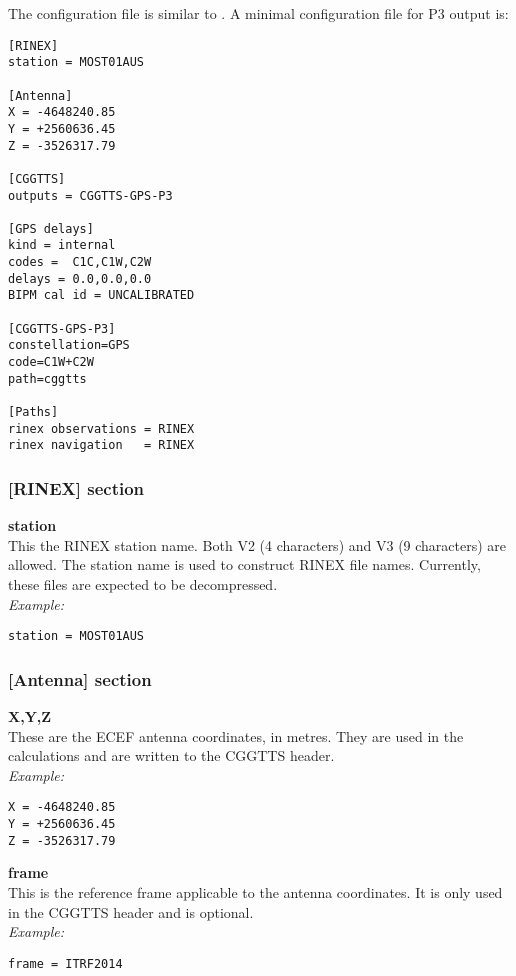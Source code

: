 The configuration file is similar to .
A minimal configuration file for P3 output is:

\begin{lstlisting}
[RINEX]
station = MOST01AUS

[Antenna]
X = -4648240.85 
Y = +2560636.45 
Z = -3526317.79 

[CGGTTS]
outputs = CGGTTS-GPS-P3

[GPS delays]
kind = internal
codes =  C1C,C1W,C2W
delays = 0.0,0.0,0.0
BIPM cal id = UNCALIBRATED

[CGGTTS-GPS-P3]
constellation=GPS
code=C1W+C2W
path=cggtts

[Paths]
rinex observations = RINEX
rinex navigation   = RINEX

\end{lstlisting}

\subsubsection{[RINEX] section }

{\bfseries station}\\
This the RINEX station name. 
Both V2 (4 characters) and V3 (9 characters) are allowed.
The station name is used to construct RINEX file names.
Currently, these files are expected to be decompressed.\\
\textit{Example:}
\begin{lstlisting}
station = MOST01AUS
\end{lstlisting}

\subsubsection{[Antenna] section }

{\bfseries X,Y,Z}\\
These are the ECEF antenna coordinates, in metres.
They are used in the calculations and are written to the CGGTTS header.\\
\textit{Example:}
\begin{lstlisting}
X = -4648240.85 
Y = +2560636.45 
Z = -3526317.79
\end{lstlisting}


{\bfseries frame}\\
This is the reference frame applicable to the antenna coordinates.
It is only used in the CGGTTS header and is optional.\\
\textit{Example:}
\begin{lstlisting}
frame = ITRF2014
\end{lstlisting}
	

